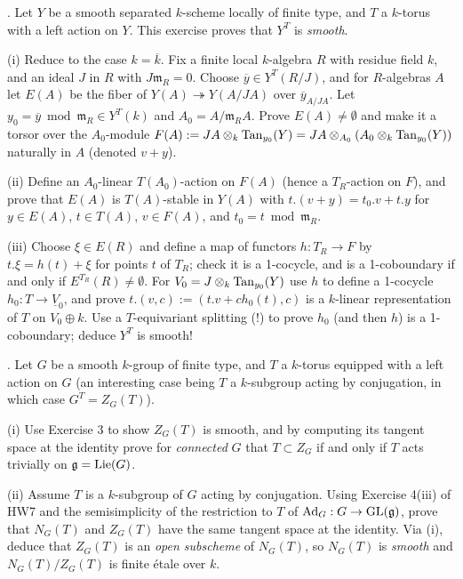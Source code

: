 \documentclass[10pt]{amsart}
\begin{document}
\medskip{}.  Let $Y$ be a smooth separated $k$-scheme locally of finite type, and 
$T$ a $k$-torus with a left action on $Y$.  This exercise proves that
$Y^T$ is {\em smooth}.  

(i) Reduce to the case $k = \overline{k}$.
Fix a finite local $k$-algebra $R$
with residue field $k$, and an ideal $J$ in $R$ with $J \mathfrak{m}_R = 0$.
Choose $\overline{y} \in Y^T(R/J)$, and for $R$-algebras $A$ let $E(A)$ be
the fiber of $Y(A) \twoheadrightarrow Y(A/JA)$ over $\overline{y}_{A/JA}$.
Let $y_0 = \overline{y} \bmod \mathfrak{m}_R \in Y^T(k)$ and $A_0 = A/\mathfrak{m}_R A$.
Prove $E(A) \ne \emptyset$ and make it a torsor over the $A_0$-module
$F(A) := JA \otimes_k {\rm{Tan}}_{y_0}(Y) = JA \otimes_{A_0} (A_0 \otimes_k {\rm{Tan}}_{y_0}(Y))$
naturally in $A$ (denoted $v+y$). 

(ii) Define an $A_0$-linear $T(A_0)$-action on $F(A)$ (hence a $T_R$-action on $F$),
and prove that $E(A)$ is $T(A)$-stable in 
$Y(A)$ with $t.(v+y) = t_0.v + t.y$ for $y \in E(A)$, $t \in T(A)$, $v \in F(A)$, 
and $t_0 = t \bmod \mathfrak{m}_R$.

(iii) Choose $\xi \in E(R)$ and define a map of functors
$h:T_R \rightarrow F$ by $t.\xi = h(t) + \xi$ for 
points $t$ of $T_R$; check
it is a 1-cocycle, and is a 1-coboundary if and only if $E^{T_R}(R) \ne \emptyset$.
For $V_0 = J \otimes_k {\rm{Tan}}_{y_0}(Y)$
use $h$ to define a 1-cocycle $h_0:T \rightarrow \underline{V}_0$, and prove
$t.(v,c) := (t.v + c h_0(t), c)$ is a $k$-linear representation of $T$ on $V_0 \oplus k$.
Use a $T$-equivariant splitting (!) to prove $h_0$ (and then $h$) is a 1-coboundary;
deduce 
$Y^T$ is smooth!

\medskip{}. Let $G$ be a smooth $k$-group of finite type, and $T$ a $k$-torus equipped with 
a left action on $G$ (an interesting case being $T$ a $k$-subgroup acting by conjugation, in
which case $G^T = Z_G(T)$).

(i) Use Exercise 3 to show $Z_G(T)$ is smooth, and 
by computing its tangent space at the identity prove for {\em connected} $G$ that
$T \subset Z_G$ if and only if $T$ acts trivially on $\mathfrak{g} = {\rm{Lie}}(G)$.

(ii) Assume $T$ is a $k$-subgroup of $G$ acting by conjugation. Using Exercise 4(iii) of
HW7 and the semisimplicity of the restriction to $T$ of ${\rm{Ad}}_G:G \rightarrow 
{\rm{GL}}(\mathfrak{g})$, prove that $N_G(T)$ and $Z_G(T)$ have the same tangent space
at the identity.  Via (i), deduce that $Z_G(T)$ is an {\em open subscheme} of $N_G(T)$,
so $N_G(T)$ is {\em smooth} and $N_G(T)/Z_G(T)$ is finite \'etale over $k$. 
\end{document}
